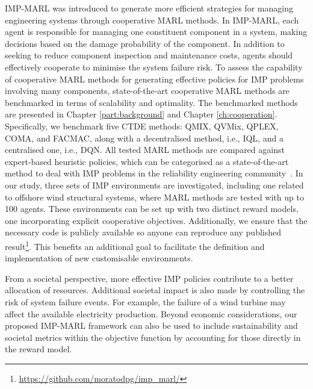 IMP-MARL was introduced to generate more efficient strategies for managing engineering systems through cooperative MARL methods.
In IMP-MARL, each agent is responsible for managing one constituent component in a system, making decisions based on the damage probability of the component.
In addition to seeking to reduce component inspection and maintenance costs, agents should effectively cooperate to minimise the system failure risk.
To assess the capability of cooperative MARL methods for generating effective policies for IMP problems involving many components, state-of-the-art cooperative MARL methods are benchmarked in terms of scalability and optimality.
The benchmarked methods are presented in Chapter \ref{part:background} and Chapter \ref{ch:cooperation}.
Specifically, we benchmark five CTDE methods: QMIX, QVMix, QPLEX, COMA, and FACMAC, along with a decentralised method, i.e., IQL, and a centralised one, i.e., DQN.
All tested MARL methods are compared against expert-based heuristic policies, which can be categorised as a state-of-the-art method to deal with IMP problems in the reliability engineering community~\citep{LuqueDBN2019, morato2022optimal}.
In our study, three sets of IMP environments are investigated, including one related to offshore wind structural systems, where MARL methods are tested with up to 100 agents.
These environments can be set up with two distinct reward models, one incorporating explicit cooperative objectives.
Additionally, we ensure that the necessary code is publicly available so anyone can reproduce any published result\footnote{\url{https://github.com/moratodpg/imp_marl/}}.
This benefits an additional goal to facilitate the definition and implementation of new customisable environments.

From a societal perspective, more effective IMP policies contribute to a better allocation of resources.
Additional societal impact is also made by controlling the risk of system failure events.
For example, the failure of a wind turbine may affect the available electricity production. 
Beyond economic considerations, our proposed IMP-MARL framework can also be used to include sustainability and societal metrics within the objective function by accounting for those directly in the reward model.

